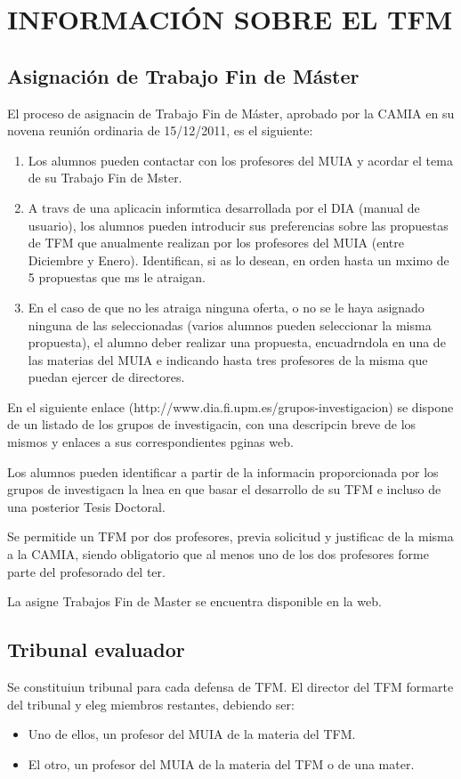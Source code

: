 \section{INFORMACIÓN SOBRE EL TFM}

\subsection{Asignación de Trabajo Fin de Máster}
\noindent El proceso de asignacin de Trabajo Fin de Máster, aprobado por la CAMIA en su novena reunión ordinaria de 15/12/2011, es el siguiente:
\begin{enumerate}
	\item Los alumnos pueden contactar con los profesores del MUIA y acordar el tema de su Trabajo Fin de Mster.
	\item A travs de una aplicacin informtica desarrollada por el DIA (manual de usuario), los alumnos pueden introducir sus preferencias sobre las propuestas de TFM que anualmente realizan por los profesores del MUIA (entre Diciembre y Enero). Identifican, si as lo desean, en orden hasta un mximo de 5 propuestas que ms le atraigan.
	\item En el caso de que no les atraiga ninguna oferta, o no se le haya asignado ninguna de las seleccionadas (varios alumnos pueden seleccionar la misma propuesta), el alumno deber realizar una propuesta, encuadrndola en una de las materias del MUIA e indicando hasta tres profesores de la misma que puedan ejercer de directores.
\end{enumerate}

En el siguiente enlace (http://www.dia.fi.upm.es/grupos-investigacion) se dispone de un listado de los grupos de investigacin, con una descripcin breve de los mismos y enlaces a sus correspondientes pginas web.

Los alumnos pueden identificar a partir de la informacin proporcionada por los grupos de investigacn la lnea en que basar el desarrollo de su TFM e incluso de una posterior Tesis Doctoral.

Se permitide un TFM por dos profesores, previa solicitud y justificac de la misma a la CAMIA, siendo obligatorio que al menos uno de los dos profesores forme parte del profesorado del ter.

La  asigne Trabajos Fin de Master se encuentra disponible en la web.



\subsection{Tribunal evaluador}
\noindent Se constituiun tribunal para cada defensa de TFM. El director del TFM formarte del tribunal y eleg miembros restantes, debiendo ser:
\begin{itemize}
	\item Uno de ellos, un profesor del MUIA de la materia del TFM.
	\item  El otro, un profesor del MUIA de la materia del TFM o de una mater.
\end{itemize}

